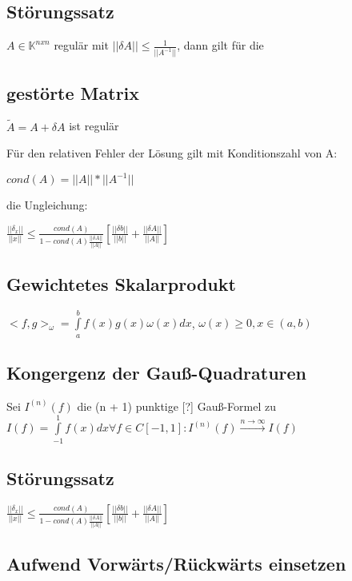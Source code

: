 \documentclass[12pt,a4paper]{article} %
\newcommand*\tab[1][1cm]{\hspace*{#1}}
\begin{document}
	\subsection{Störungssatz}
	
	$A \in \mathbb{K}^{n x n}$ regulär mit $||\delta A|| \le \frac{1}{||A^{-1}||}$, dann gilt für die
	
	\subsection{gestörte Matrix}
	
	$\tilde{A} = A + \delta A$ ist regulär
	
	Für den relativen Fehler der Lösung gilt mit Konditionszahl von A:
	
	\tab $cond(A) = ||A|| * ||A^{-1}||$
	
	die Ungleichung:
	
	\tab $\frac{||\delta_x||}{||x||} \le \frac{cond(A)}{1 - cond(A) \frac{||\delta A||}{||A||}}\left[ \frac{||\delta b||}{||b||} + \frac{||\delta A||}{||A||}\right] $
	
	\subsection{Gewichtetes Skalarprodukt}
	
	$<f, g>_\omega = \int\limits_a^bf(x)g(x)\omega(x)dx$, \tab $\omega(x)\ge 0, x \in (a, b)$
	
	\subsection{Kongergenz der Gauß-Quadraturen}
	
	Sei $I^{(n)}(f)$ die (n + 1) punktige [?] Gauß-Formel zu $I(f) = \int\limits_{-1}^1f(x)dx \forall f \in C[-1, 1]: I^{(n)}(f) \xrightarrow{n \rightarrow \infty} I(f)$
	
	\subsection{Störungssatz}
	
	$\frac{||\delta_x||}{||x||} \le \frac{cond(A)}{1 - cond(A) \frac{||\delta A||}{||A||}}\left[ \frac{||\delta b||}{||b||} + \frac{||\delta A||}{||A||}\right] $
	
	\subsection{Aufwend Vorwärts/Rückwärts einsetzen}
	
\end{document}
